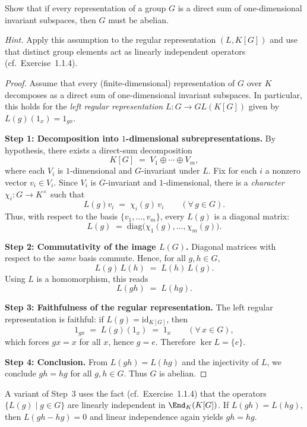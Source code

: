 \begin{exercise}[1.2.5]\label{ex:1.2.5}
Show that if every representation of a group $G$ is a direct sum of one-dimensional invariant subspaces,
then $G$ must be abelian.

\emph{Hint.} Apply this assumption to the regular representation $(L,K[G])$ and use that
distinct group elements act as linearly independent operators (cf.\ Exercise~1.1.4).
\end{exercise}

\begin{proof}
Assume that every (finite-dimensional) representation of $G$ over $K$ decomposes as a direct sum of
one-dimensional invariant subspaces. In particular, this holds for the \emph{left regular representation}
$L:G\to GL(K[G])$ given by $L(g)(1_x)=1_{gx}$.

\smallskip
\noindent\textbf{Step 1: Decomposition into $1$-dimensional subrepresentations.}
By hypothesis, there exists a direct-sum decomposition
\[
K[G] \;=\; V_1 \oplus \cdots \oplus V_m,
\]
where each $V_i$ is $1$-dimensional and $G$-invariant under $L$.  
Fix for each $i$ a nonzero vector $v_i\in V_i$.  
Since $V_i$ is $G$-invariant and $1$-dimensional, there is a \emph{character} $\chi_i:G\to K^\times$ such that
\[
L(g)v_i \;=\; \chi_i(g)\,v_i \qquad (\forall\,g\in G).
\]
Thus, with respect to the basis $\{v_1,\dots,v_m\}$, every $L(g)$ is a diagonal matrix:
\[
L(g) \;=\; \mathrm{diag}\big(\chi_1(g),\dots,\chi_m(g)\big).
\]

\smallskip
\noindent\textbf{Step 2: Commutativity of the image $L(G)$.}
Diagonal matrices with respect to the \emph{same} basis commute. Hence, for all $g,h\in G$,
\[
L(g)\,L(h) \;=\; L(h)\,L(g).
\]
Using $L$ is a homomorphism, this reads
\[
L(gh) \;=\; L(hg).
\]

\smallskip
\noindent\textbf{Step 3: Faithfulness of the regular representation.}
The left regular representation is faithful: if $L(g)=\mathrm{id}_{K[G]}$, then
\[
1_{gx} \;=\; L(g)(1_x) \;=\; 1_x \qquad (\forall\,x\in G),
\]
which forces $gx=x$ for all $x$, hence $g=e$. Therefore $\ker L=\{e\}$.

\smallskip
\noindent\textbf{Step 4: Conclusion.}
From $L(gh)=L(hg)$ and the injectivity of $L$, we conclude $gh=hg$ for all $g,h\in G$.  
Thus $G$ is abelian.
\end{proof}

\begin{remark}
A variant of Step~3 uses the fact (cf.\ Exercise~1.1.4) that the operators $\{L(g)\mid g\in G\}$ are linearly independent in
$\End_K(K[G])$. If $L(gh)=L(hg)$, then $L(gh-hg)=0$ and linear independence again yields $gh=hg$.
\end{remark}


